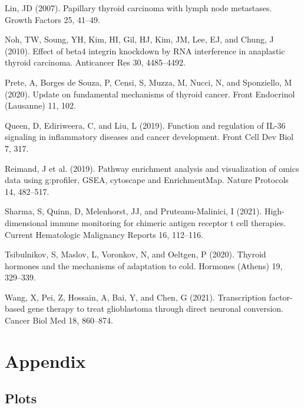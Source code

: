 \documentclass[
  parskip,
  oneside]{scrreprt}
\newlength{\cslhangindent}
\newlength{\cslentryspacingunit} %
\newenvironment{CSLReferences}[2] %
 {%
  \setlength{\parindent}{0pt}
  \ifodd #1
  \let\oldpar\par
  \def\par{\hangindent=\cslhangindent\oldpar}
  \fi
  \setlength{\parskip}{#2\cslentryspacingunit}
 }%
 {}
\begin{document}
\begin{CSLReferences}{0}{0}
\leavevmode{}%
Lin, JD (2007). Papillary thyroid carcinoma with lymph node metastases.
Growth Factors 25, 41--49.

\leavevmode{}%
Noh, TW, Soung, YH, Kim, HI, Gil, HJ, Kim, JM, Lee, EJ, and Chung, J
(2010). Effect of {beta}4 integrin knockdown by RNA interference in
anaplastic thyroid carcinoma. Anticancer Res 30, 4485--4492.

\leavevmode{}%
Prete, A, Borges de Souza, P, Censi, S, Muzza, M, Nucci, N, and
Sponziello, M (2020). Update on fundamental mechanisms of thyroid
cancer. Front Endocrinol (Lausanne) 11, 102.

\leavevmode{}%
Queen, D, Ediriweera, C, and Liu, L (2019). Function and regulation of
IL-36 signaling in inflammatory diseases and cancer development. Front
Cell Dev Biol 7, 317.

\leavevmode{}%
Reimand, J et al. (2019). Pathway enrichment analysis and visualization
of omics data using g:profiler, GSEA, cytoscape and EnrichmentMap.
Nature Protocols 14, 482--517.

\leavevmode{}%
Sharma, S, Quinn, D, Melenhorst, JJ, and Pruteanu-Malinici, I (2021).
High-dimensional immune monitoring for chimeric antigen receptor t cell
therapies. Current Hematologic Malignancy Reports 16, 112--116.

\leavevmode{}%
Tsibulnikov, S, Maslov, L, Voronkov, N, and Oeltgen, P (2020). Thyroid
hormones and the mechanisms of adaptation to cold. Hormones (Athens) 19,
329--339.

\leavevmode{}%
Wang, X, Pei, Z, Hossain, A, Bai, Y, and Chen, G (2021). Transcription
factor-based gene therapy to treat glioblastoma through direct neuronal
conversion. Cancer Biol Med 18, 860--874.

\end{CSLReferences}

\hypertarget{appendix}{%
\chapter{Appendix}\label{appendix}}

\hypertarget{plots}{%
\section{Plots}\label{plots}}
\end{document}
